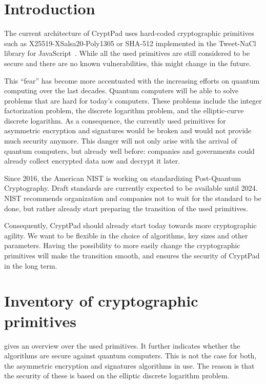 \documentclass[a4paper, 11pt]{article}
\begin{document}
\tableofcontents

\newpage

\section{Introduction}


The current architecture of CryptPad uses hard-coded cryptographic primitives such as X25519-XSalsa20-Poly1305 or SHA-512 implemented in the Tweet-NaCl library for JavaScript~\cite{Bernstein2015,Chestnykhm2016}.
While all the used primitives are still considered to be secure and there are no known vulnerabilities, this might change in the future.

This \enquote{fear} has become more accentuated with the increasing efforts on quantum computing over the last decades.
Quantum computers will be able to solve problems that are hard for today's computers.
These problems include the integer factorization problem, the discrete logarithm problem, and the elliptic-curve discrete logarithm.
As a consequence, the currently used primitives for asymmetric encryption and signatures would be broken and would not provide much security anymore.
This danger will not only arise with the arrival of quantum computers, but already well before: companies and governments could already collect encrypted data now and decrypt it later.

Since 2016, the American \ac{NIST} is working on standardizing Post-Quantum Cryptography.
Draft standards are currently expected to be available until 2024.
\ac{NIST} recommends organization and companies not to wait for the standard to be done, but rather already start preparing the transition of the used primitives.

Consequently, CryptPad should already start today towards more cryptographic agility.
We want to be flexible in the choice of algorithms, key sizes and other parameters.
Having the possibility to more easily change the cryptographic primitives will make the transition smooth, and ensures the security of CryptPad in the long term.

\section{Inventory of cryptographic primitives}

 gives an overview over the used primitives.
It further indicates whether the algorithms are secure against quantum computers.
This is not the case for both, the asymmetric encryption and signatures algorithms in use.
The reason is that the security of these is based on the elliptic discrete logarithm problem.
\end{document}

